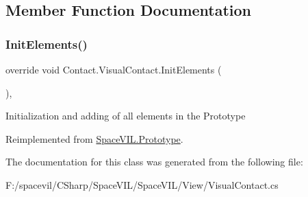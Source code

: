 \subsection{Member Function Documentation}
\mbox{\label{class_contact_1_1_visual_contact_a975573507e5e287632273df844dc7792}} 
\subsubsection{\texorpdfstring{Init\+Elements()}{InitElements()}}
{\footnotesize\ttfamily override void Contact.\+Visual\+Contact.\+Init\+Elements (\begin{DoxyParamCaption}{ }\end{DoxyParamCaption})\hspace{0.3cm}{\ttfamily [inline]}, {\ttfamily [virtual]}}



Initialization and adding of all elements in the Prototype 



Reimplemented from \mbox{\hyperlink{class_space_v_i_l_1_1_prototype_ac3379fe02923ee155b5b0084abf27420}{Space\+V\+I\+L.\+Prototype}}.



The documentation for this class was generated from the following file\+:\begin{DoxyCompactItemize}
\item 
F\+:/spacevil/\+C\+Sharp/\+Space\+V\+I\+L/\+Space\+V\+I\+L/\+View/Visual\+Contact.\+cs\end{DoxyCompactItemize}
